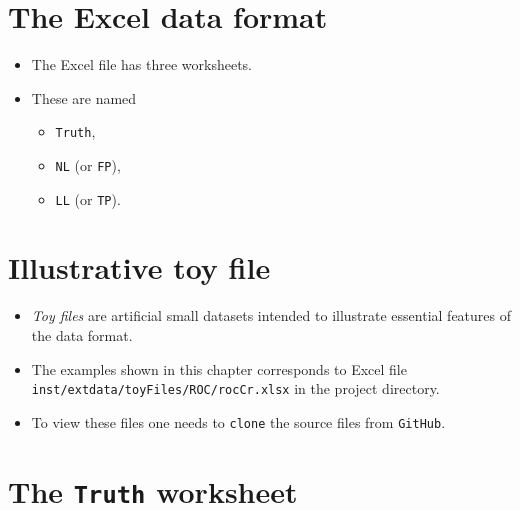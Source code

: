 \documentclass[
]{book}
\providecommand{\tightlist}{%
  \setlength{\itemsep}{0pt}\setlength{\parskip}{0pt}}
\begin{document}
\hypertarget{rocExceldataformat}{%
\section{The Excel data format}\label{rocExceldataformat}}

\begin{itemize}
\tightlist
\item
  The Excel file has three worksheets.
\item
  These are named

  \begin{itemize}
  \tightlist
  \item
    \texttt{Truth},
  \item
    \texttt{NL} (or \texttt{FP}),
  \item
    \texttt{LL} (or \texttt{TP}).
  \end{itemize}
\end{itemize}

\hypertarget{illustrative-toy-file}{%
\section{Illustrative toy file}\label{illustrative-toy-file}}

\begin{itemize}
\tightlist
\item
  \emph{Toy files} are artificial small datasets intended to illustrate essential features of the data format.\\
\item
  The examples shown in this chapter corresponds to Excel file \texttt{inst/extdata/toyFiles/ROC/rocCr.xlsx} in the project directory.
\item
  To view these files one needs to \texttt{clone} the source files from \texttt{GitHub}.
\end{itemize}

\hypertarget{rocExcelTruthdataformat}{%
\section{\texorpdfstring{The \texttt{Truth} worksheet}{The Truth worksheet}}\label{rocExcelTruthdataformat}}
\end{document}
